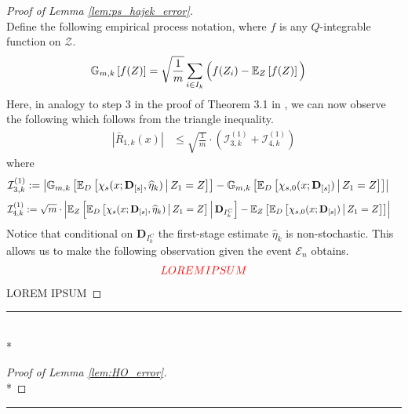 \begin{proof}[Proof of Lemma \ref{lem:ps_hajek_error}]
\begin{equation}
    \end{equation}
    Define the following empirical process notation, where $f$ is any $Q$-integrable function on $\mathcal{Z}$.
    \begin{equation}
        \begin{aligned}
            \mathbb{G}_{m,k}\left[f(Z)\right]
            & = \sqrt{\frac{1}{m}} \sum_{i \in I_{k}} \Big(f(Z_i) - \mathbb{E}_{Z}\left[f(Z)\right]\Big)
        \end{aligned}
    \end{equation}
    Here, in analogy to step 3 in the proof of Theorem 3.1 in \citet{chernozhukov_doubledebiased_2018}, we can now observe the following which follows from the triangle inequality.
    \begin{equation}
        \begin{aligned}
            \left|\bar{R}_{1, k}\left(x\right)\right|
            & \leq \sqrt{\frac{1}{m}} \cdot \left(\mathcal{I}_{3,k}^{(1)} + \mathcal{I}_{4,k}^{(1)}\right)
        \end{aligned}
    \end{equation}
    where
    \begin{equation}
        \begin{aligned}
            \mathcal{I}_{3,k}^{(1)} 
            & := \left|\mathbb{G}_{m,k}\left[\mathbb{E}_{D}\left[\chi_{s}(x; \mathbf{D}_{[s]}, \widehat{\eta}_{k})\, \middle| \, Z_1 = Z \right]\right] 
            - \mathbb{G}_{m,k}\left[\mathbb{E}_{D}\left[\chi_{s,0}(x; \mathbf{D}_{[s]})\, \middle| \, Z_1 = Z \right]\right]\right|
        \end{aligned}
    \end{equation}
    \begin{equation}
        \begin{aligned}
            \mathcal{I}_{4,k}^{(1)} 
            & := \sqrt{m} \cdot \left|
            \mathbb{E}_{Z}\left[\mathbb{E}_{D}\left[\chi_{s}(x; \mathbf{D}_{[s]}, \widehat{\eta}_{k})\, \middle| \, Z_1 = Z \right] \, \middle| \, \mathbf{D}_{I_{k}^{C}}\right]
            - \mathbb{E}_{Z}\left[\mathbb{E}_{D}\left[\chi_{s,0}(x; \mathbf{D}_{[s]})\, \middle| \, Z_1 = Z \right]\right]\right|
        \end{aligned}
    \end{equation}
    Notice that conditional on $\mathbf{D}_{I_{k}^{C}}$ the first-stage estimate $\hat{\eta}_{k}$ is non-stochastic.
    This allows us to make the following observation given the event $\mathcal{E}_{n}$ obtains.
    \begin{equation}
        \begin{aligned}
            {\color{red} LOREM IPSUM}
        \end{aligned}
    \end{equation}
{\color{red} LOREM IPSUM}
\end{proof}

\hrule

\begin{lem}\label{lem:HO_error}\mbox{}\\*
    
\end{lem}

\begin{proof}[Proof of Lemma \ref{lem:HO_error}]\mbox{}\\*
    
\end{proof}

\hrule